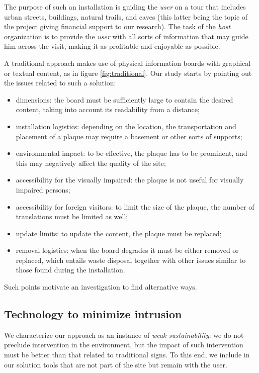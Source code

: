 \documentclass[sustainability,article,submit,pdftex,moreauthors]{Definitions/mdpi}
\begin{document}
The purpose of such an installation is guiding the {\em user} on a tour that includes urban streets, buildings, natural trails, and caves (this latter being the topic of the project giving financial support to our research). The task of the {\em host} organization is to provide the {\em user} with all sorts of information that may guide him across the visit, making it as profitable and enjoyable as possible.

A traditional approach makes use of physical information boards with graphical or textual content, as in figure \ref{fig:traditional}. Our study starts by pointing out the issues related to such a solution:

\begin{itemize}
	\item dimensions: the board must be sufficiently large to contain the desired content, taking into account its readability from a distance;
	\item installation logistics: depending on the location, the transportation and placement of a plaque may require a basement or other sorts of supports;
	\item environmental impact: to be effective, the plaque has to be prominent, and this may negatively affect the quality of the site; 
	\item accessibility for the visually impaired: the plaque is not useful for visually impaired persons;
	\item accessibility for foreign visitors: to limit the size of the plaque, the number of translations must be limited as well;
	\item update limits: to update the content, the plaque must be replaced;
	\item removal logistics: when the board degrades it must be either removed or replaced, which entails waste disposal together with other issues similar to those found during the installation.
\end{itemize}

Such points motivate an investigation to find alternative ways.

\subsection{Technology to minimize intrusion \label{sec:minimize}}

We characterize our approach as an instance of {\em weak sustainability}: we do not preclude intervention in the environment, but the impact of such intervention must be better than that related to traditional signs. To this end, we include in our solution tools that are not part of the site but remain with the user.   
\end{document}
